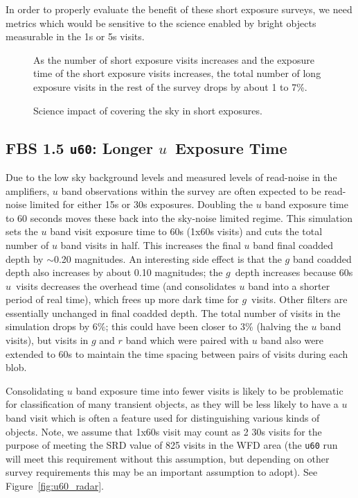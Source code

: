 In order to properly evaluate the benefit of these short exposure surveys, we need metrics which would be sensitive to the science enabled by bright objects measurable in the 1s or 5s visits.

\begin{figure}
\caption{As the number of short exposure visits increases and the exposure time of the short exposure visits increases, the total number of long exposure visits in the rest of the survey drops by about 1 to 7\%. }\label{fig:shortexp_nvisits}
\end{figure}

\begin{figure}
\caption{Science impact of covering the sky in short exposures. }\label{fig:shortexp_radar}
\end{figure}


\subsection{FBS 1.5 {\tt u60}: Longer $u$\ Exposure Time}\label{ss:u60}

Due to the low sky background levels and measured levels of read-noise in the amplifiers, $u$ band observations within the survey are often expected to be read-noise limited for either 15s or 30s exposures. Doubling the $u$ band exposure time to 60 seconds moves these back into the sky-noise limited regime. This simulation sets the $u$ band visit exposure time to 60s (1x60s visits) and cuts the total number of $u$ band visits in half. This increases the final $u$ band final coadded depth by $\sim$0.20 magnitudes. An interesting side effect is that the $g$ band coadded depth also increases by about 0.10 magnitudes; the $g$\ depth increases because 60s $u$\ visits decreases the overhead time (and consolidates $u$ band into a shorter period of real time), which frees up more dark time for $g$\ visits. Other filters are essentially unchanged in final coadded depth. The total number of visits in the simulation drops by 6\%; this could have been closer to 3\% (halving the $u$ band visits), but visits in $g$ and $r$ band which were paired with $u$ band also were extended to 60s to maintain the time spacing between pairs of visits during each blob.

Consolidating $u$ band exposure time into fewer visits is likely to be problematic for classification of many transient objects, as they will be less likely to have a $u$ band visit which is often a feature used for distinguishing various kinds of objects. Note, we assume that 1x60s visit may count as 2 30s visits for the purpose of meeting the SRD value of 825 visits in the WFD area (the {\tt u60} run will meet this requirement without this assumption, but depending on other survey requirements this may be an important assumption to adopt). See Figure~\ref{fig:u60_radar}. 


